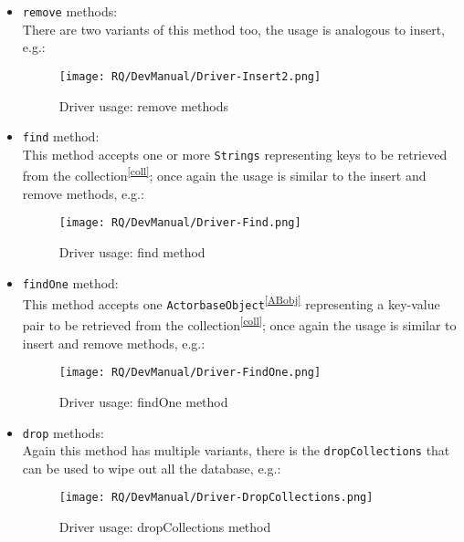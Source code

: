 \documentclass{scalatekids-article}
\begin{document}
\begin{itemize}
\begin{itemize}
  \end{itemize}
\item \verb=remove= methods:\\ There are two variants of this method too, the usage is
  analogous to insert, e.g.:
   \begin{figure}[H]
     \begin{center}
       \texttt{[image: RQ/DevManual/Driver-Insert2.png]}
       \caption{Driver usage: remove methods}
     \end{center}
   \end{figure}
\item \verb=find= method:\\ This method accepts one or more \verb=Strings= representing
  keys to be retrieved from the collection\textsuperscript{\ref{coll}}; once again the usage is similar to the insert and
  remove methods, e.g.:
   \begin{figure}[H]
     \begin{center}
       \texttt{[image: RQ/DevManual/Driver-Find.png]}
       \caption{Driver usage: find method}
     \end{center}
   \end{figure}
\item \verb=findOne= method:\\ This method accepts one \verb=ActorbaseObject=\textsuperscript{\ref{ABobj}} representing
  a key-value pair to be retrieved from the collection\textsuperscript{\ref{coll}}; once again the usage is similar to insert and
  remove methods, e.g.:
   \begin{figure}[H]
     \begin{center}
       \texttt{[image: RQ/DevManual/Driver-FindOne.png]}
       \caption{Driver usage: findOne method}
     \end{center}
   \end{figure}
\item \verb=drop= methods:\\ Again this method has multiple variants, there is the
  \verb=dropCollections= that can be used to wipe out all the database, e.g.:
   \begin{figure}[H]
     \begin{center}
       \texttt{[image: RQ/DevManual/Driver-DropCollections.png]}
       \caption{Driver usage: dropCollections method}
     \end{center}

\end{figure}
\end{itemize}
\end{document}
